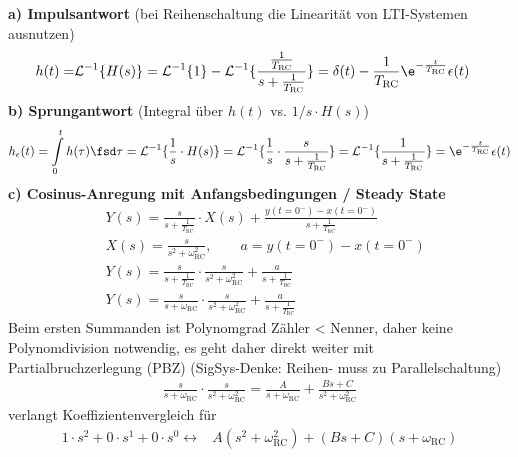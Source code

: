 \begin{Loesung}
\textbf{a) Impulsantwort} (bei Reihenschaltung die Linearität von LTI-Systemen ausnutzen)
\begin{align}
h(t) =& \mathcal{L}^{-1}\{H(s)\} = \mathcal{L}^{-1}\{1\} - \mathcal{L}^{-1}\{\frac{\frac{1}{T_\text{RC}}}{s + \frac{1}{T_\text{RC}}}\}
= \delta(t) - \frac{1}{T_\text{RC}} \e^{-\frac{t}{T_\text{RC}}} \epsilon(t)
\end{align}
%
\textbf{b) Sprungantwort} (Integral über $h(t)$ vs. $1/s \cdot H(s)$)
\begin{align}
h_\epsilon(t) = \int\limits_{0}^{t} h(\tau) \fsd \tau = \mathcal{L}^{-1}\{\frac{1}{s} \cdot H(s)\} =
\mathcal{L}^{-1}\{\frac{1}{s} \cdot \frac{s}{s + \frac{1}{T_\text{RC}}}\}
=
\mathcal{L}^{-1}\{\frac{1}{s + \frac{1}{T_\text{RC}}}\} = \e^{-\frac{t}{T_\text{RC}}} \epsilon(t)
\end{align}
%
\textbf{c) Cosinus-Anregung mit Anfangsbedingungen / Steady State}
\begin{align}
&Y(s) = \frac{s}{s + \frac{1}{T_\text{RC}}} \cdot X(s) + \frac{y(t=0^-) - x(t=0^-)}{s + \frac{1}{T_\text{RC}}}\\
&X(s) = \frac{s}{s^2+\omega_\text{RC}^2}, \qquad a = y(t=0^-) - x(t=0^-)\\
&Y(s) = \frac{s}{s + \frac{1}{T_\text{RC}}} \cdot \frac{s}{s^2+\omega_\text{RC}^2} + \frac{a}{s + \frac{1}{T_\text{RC}}}\\
&Y(s) = \frac{s}{s + \omega_\text{RC}} \cdot \frac{s}{s^2+\omega_\text{RC}^2} + \frac{a}{s + \frac{1}{T_\text{RC}}}
\end{align}
Beim ersten Summanden ist Polynomgrad Zähler < Nenner, daher keine Polynomdivision notwendig, es geht daher direkt weiter mit Partialbruchzerlegung (PBZ) (SigSys-Denke: Reihen- muss zu Parallelschaltung)
\begin{align}
\frac{s}{s + \omega_\text{RC}} \cdot \frac{s}{s^2+\omega_\text{RC}^2} =
\frac{A}{s + \omega_\text{RC}} + \frac{Bs+C}{s^2+\omega_\text{RC}^2}
\end{align}
verlangt Koeffizientenvergleich für
\begin{align}
1 \cdot s^2 + 0 \cdot s^1 + 0 \cdot s^0 \leftrightarrow & A (s^2+\omega_\mathrm{RC}^2) + (B s + C) (s+\omega_\mathrm{RC})
\end{align}

\end{Loesung}
